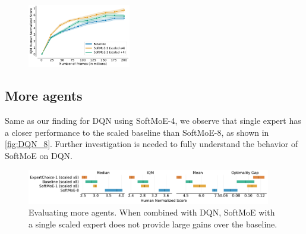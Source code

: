 \paragraph{}

\begin{figure}[h!]
    \centering
    \includegraphics[width=0.4\textwidth]{figures/results/Baselines_scaled_down.pdf}

    \vspace{-0.4cm}
    \caption{}
    \label{fig:analysis_scaledown_SoftMoE-1}
    \vspace{-0.2cm}
\end{figure}


\subsection{More agents}
Same as our finding for DQN using SoftMoE-4, we observe that single expert has a closer performance to the scaled baseline than SoftMoE-8, as shown in \autoref{fig:DQN_8}. Further investigation is needed to fully understand the behavior of SoftMoE on DQN.


\begin{figure}[!h]
    \centering
    \includegraphics[width=0.95\textwidth]{figures/results/SoftMoE-8_DQN_IntEstimates.pdf}
    \caption{Evaluating more agents. When combined with DQN, SoftMoE with a single scaled expert does not provide large gains over the baseline. %
    }
    \label{fig:DQN_8}
    \vspace{-0.2cm}
\end{figure}


